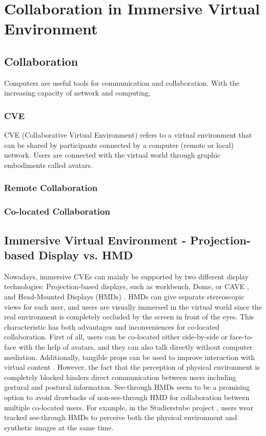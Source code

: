 \chapter{Collaboration in Immersive Virtual Environment}
\label{chapter:context}


\section{Collaboration}
Computers are useful tools for communication and collaboration. With the increasing capacity of network and computing, 

\subsection{CVE}
CVE (Collaborative Virtual Environment) refers to a virtual environment that can be shared by participants connected by a computer (remote or local) network. Users are connected with the virtual world through graphic embodiments called avatars.

\subsection{Remote Collaboration}

\subsection{Co-located Collaboration}


\section{Immersive Virtual Environment - Projection-based Display vs. HMD}

Nowadays, immersive CVEs can mainly be supported by two different display technologies: Projection-based displays, such as workbench, Dome, or CAVE \citep{CruzNeira1993SPV}, and Head-Mounted Displays (HMDs) \citep{Melzer1997HMD}. HMDs can give separate stereoscopic views for each user, and users are visually immersed in the virtual world since the real environment is completely occluded by the screen in front of the eyes. This characteristic has both advantages and inconveniences for co-located collaboration. First of all, users can be co-located either side-by-side or face-to-face with the help of avatars, and they can also talk directly without computer mediation. Additionally, tangible props can be used to improve interaction with virtual content \citep{Salzmann2008TUS}. However, the fact that the perception of physical environment is completely blocked hinders direct communication between users including gestural and postural information. See-through HMDs seem to be a promising option to avoid drawbacks of non-see-through HMD for collaboration between multiple co-located users. For example, in the Studierstube project \citep{Schmalstieg2002Studierstube}, users wear tracked see-through HMDs to perceive both the physical environment and synthetic images at the same time.

